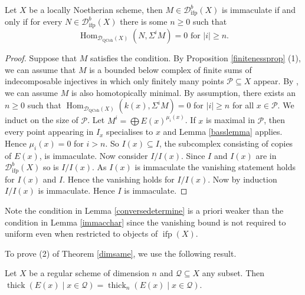 \documentclass[12pt,oneside]{amsart}
\DeclareMathOperator{\Hom}{Hom}
\DeclareMathOperator{\thick}{thick}
\DeclareMathOperator{\QCoh}{QCoh}
\DeclareMathOperator{\ifp}{ifp}
\begin{document}
\begin{lemma} \label{conversedetermine}
Let $X$ be a locally Noetherian scheme, then $M \in \mathcal{D}^b_{\ifp}(X)$ is immaculate if and only if for every $ N \in \mathcal{D}^b_{\ifp}(X)$ there is some $n \geq 0$ such that  
\[
\Hom_{\mathcal{D}_{\QCoh}(X)}(N,\Sigma^i M) = 0 \text{ for } \lvert i \rvert \geq n. 
\]
\end{lemma}

\begin{proof}
Suppose that $M$ satisfies the condition. By Proposition \ref{finitenessprop} (1), we can assume that $M$ is a bounded below complex of finite sums of indecomposable injectives in which only finitely many points $\mathcal{P} \subseteq X$ appear. By \cite[Proposition B.2]{kra05}, we can assume $M$ is also homotopically minimal. By assumption, there exists an $n \geq 0$ such that $\Hom_{\mathcal{D}_{\QCoh}(X)}(k(x),\Sigma^i M) = 0$  for  $\lvert i \rvert \geq n$ for all $x \in \mathcal{P}$. We induct on the size of $\mathcal{P}$. Let $M^i = \bigoplus E(x)^{\mu_i(x)}$. If $x$ is maximal in $\mathcal{P}$, then every point appearing in $I_x$ specialises to $x$ and Lemma \ref{basslemma} applies. Hence $\mu_i(x) = 0$ for $i > n$. So $I(x) \subseteq I$, the subcomplex consisting of copies of $E(x)$, is immaculate. Now consider $I/I(x)$. Since $I$ and $I(x)$ are in $\mathcal{D}^b_{\ifp}(X)$ so is $I/I(x)$. As $I(x)$ is immaculate the vanishing statement holds for $I(x)$ and $I$. Hence the vanishing holds for $I/I(x)$. Now by induction $I/I(x)$ is immaculate. Hence $I$ is immaculate. 
\end{proof}

\begin{remark}
Note the condition in Lemma \ref{conversedetermine} is a priori weaker than the condition in Lemma \ref{immacchar} since the vanishing bound is not required to uniform even when restricted to objects of $\ifp(X)$.  
\end{remark}

To prove (2) of Theorem \ref{dimsame}, we use the following result. 

\begin{lemma} \label{dimensionlemma}
Let $X$ be a regular scheme of dimension $n$ and $\mathcal{Q} \subseteq X$ any subset. Then $\thick(E(x) \mid x \in \mathcal{Q}) = \thick_n(E(x) \mid x \in \mathcal{Q})$. 
\end{lemma}
\end{document}
